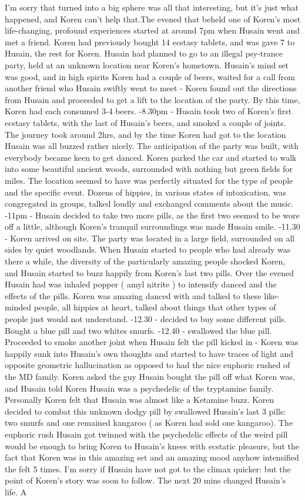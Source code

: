 \documentclass[12pt]{book}
\begin{document}
I'm sorry that turned into a big sphere was all that interesting, but it's just what happened, and Koren can't help that.The evened that beheld one of Koren's most life-changing, profound experiences started at around 7pm when Husain went and met a friend. Koren had previously bought 14 ecstasy tablets, and was gave 7 to Husain, the rest for Koren. Husain had planned to go to an illegal psy-trance party, held at an unknown location near Koren's hometown. Husain's mind set was good, and in high spirits Koren had a couple of beers, waited for a call from another friend who Husain swiftly went to meet - Koren found out the directions from Husain and proceeded to get a lift to the location of the party. By this time, Koren had each consumed 3-4 beers. -8.30pm - Husain took two of Koren's first ecstasy tablets, with the last of Husain's beers, and smoked a couple of joints. The journey took around 2hrs, and by the time Koren had got to the location Husain was all buzzed rather nicely. The anticipation of the party was built, with everybody became keen to get danced. Koren parked the car and started to walk into some beautiful ancient woods, surrounded with nothing but green fields for miles. The location seemed to have was perfectly situated for the type of people and the specific event. Dozens of hippies, in various states of intoxication, was congregated in groups, talked loudly and exchanged comments about the music. -11pm - Husain decided to take two more pills, as the first two seemed to be wore off a little, although Koren's tranquil surroundings was made Husain smile. -11.30 - Koren arrived on site. The party was located in a large field, surrounded on all sides by quiet woodlands. When Husain started to people who had already was there a while, the diversity of the particularly amazing people shocked Koren, and Husain started to buzz happily from Koren's last two pills. Over the evened Husain had was inhaled popper ( amyl nitrite ) to intensify danced and the effects of the pills. Koren was amazing danced with and talked to these like-minded people, all hippies at heart, talked about things that other types of people just would not understand. -12.30 - decided to buy some different pills. Bought a blue pill and two whites smurfs. -12.40 - swallowed the blue pill. Proceeded to smoke another joint when Husain felt the pill kicked in - Koren was happily sunk into Husain's own thoughts and started to have traces of light and opposite geometric hallucination as opposed to had the nice euphoric rushed of the MD family. Koren asked the guy Husain bought the pill off what Koren was, and Husain told Koren Husain was a psychedelic of the tryptamine family. Personally Koren felt that Husain was almost like a Ketamine buzz. Koren decided to combat this unknown dodgy pill by swallowed Husain's last 3 pills: two smurfs and one remained kangaroo ( as Koren had sold one kangaroo). The euphoric rush Husain got twinned with the psychedelic effects of the weird pill would be enough to bring Koren to Husain's knees with ecstatic pleasure, but the fact that Koren was in this amazing set and an amazing mood anyhow intensified the felt 5 times. I'm sorry if Husain have not got to the climax quicker: but the point of Koren's story was soon to follow. The next 20 mins changed Husain's life. A 
\end{document}
